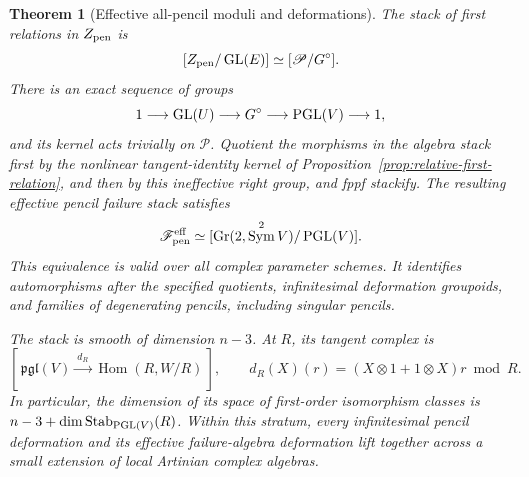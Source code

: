 \documentclass[11pt,reqno]{amsart}
\numberwithin{equation}{section}
\newtheorem{theorem}{Theorem}[section]
\theoremstyle{definition}\newtheorem{definition}[theorem]{Definition}
\theoremstyle{remark}\newtheorem{remark}[theorem]{Remark}
\DeclareMathOperator{\Sym}{Sym}\DeclareMathOperator{\Gr}{Gr}
\DeclareMathOperator{\Hom}{Hom}\DeclareMathOperator{\Tot}{Tot}
\begin{document}
\begin{theorem}[Effective all-pencil moduli and deformations]
\label{thm:pencil-stack-equivalence}
The stack of first relations in \(Z_{\rm pen}\) is
\begin{equation}\label{eq:pencil-stack-before-rigidification}
 [Z_{\rm pen}/\operatorname{GL}(E)]\simeq
                         [\mathscr P/G^\circ].
\end{equation}
There is an exact sequence of groups
\begin{equation}\label{eq:pencil-ineffective-group}
 1\longrightarrow\operatorname{GL}(U)\longrightarrow G^\circ
                 \longrightarrow\operatorname{PGL}(V)\longrightarrow1,
\end{equation}
and its kernel acts trivially on \(\mathscr P\).
Quotient the morphisms in the algebra stack first by the
nonlinear tangent-identity kernel of
Proposition~\ref{prop:relative-first-relation}, and then by this
ineffective right group, and fppf stackify.  The resulting
\emph{effective pencil failure stack} satisfies
\begin{equation}\label{eq:effective-pencil-stack}
       \mathscr F_{\rm pen}^{\rm eff}\simeq
                [\Gr(2,\Sym^2V)/\PGL(V)].
\end{equation}
This equivalence is valid over all complex parameter schemes.
It identifies automorphisms after the specified quotients,
infinitesimal deformation groupoids, and families of degenerating
pencils, including singular pencils.

The stack is smooth of dimension \(n-3\).  At \(R\), its tangent
complex is
\begin{equation}\label{eq:pencil-tangent-complex}
 [\,\mathfrak{pgl}(V)\xrightarrow{\ d_R\ }\Hom(R,W/R)\,],
 \qquad d_R(X)(r)=(X\otimes1+1\otimes X)r\bmod R.
\end{equation}
In particular, the dimension of its space of first-order
isomorphism classes is \(n-3+\dim\operatorname{Stab}_{\operatorname{PGL}(V)}(R)\).
Within this stratum, every infinitesimal pencil deformation and
its effective failure-algebra deformation lift together across a
small extension of local Artinian complex algebras.
\end{theorem}
\end{document}
